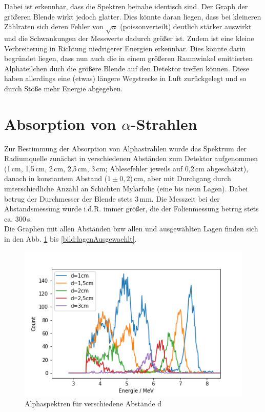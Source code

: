 Dabei ist erkennbar, dass die Spektren beinahe identisch sind. Der Graph der größeren Blende wirkt jedoch glatter. Dies könnte 
daran liegen, dass bei kleineren Zählraten sich deren Fehler von $\sqrt{n}$ (poissonverteilt) deutlich stärker auswirkt und die Schwankungen der 
Messwerte dadurch größer ist. Zudem ist eine kleine Verbreiterung in Richtung niedrigerer Energien erkennbar. Dies könnte darin begründet 
liegen, dass nun auch die in einem größeren Raumwinkel emittierten Alphateilchen duch die größere Blende auf den Detektor treffen können. 
Diese haben allerdings eine (etwas) längere Wegstrecke in Luft zurückgelegt und so durch Stöße mehr Energie abgegeben.





\section{Absorption von $\alpha$-Strahlen}
\label{subs:abs}

Zur Bestimmung der Absorption von Alphastrahlen wurde das Spektrum der Radiumquelle zunächst in verschiedenen Abständen zum Detektor 
aufgenommen (1\,cm, 1,5\,cm, 2\,cm, 2,5\,cm, 3\,cm; Ablesefehler jeweils auf 0,2\,cm abgeschätzt), danach in konstantem Abstand ($1 \pm 0,2$)\,cm, aber mit Durchgang durch 
unterschiedliche Anzahl an Schichten Mylarfolie (eine bis neun Lagen). 
Dabei betrug der Durchmesser der Blende stets 3\,mm. Die Messzeit bei der Abstandsmessung wurde i.d.R. immer größer, die der 
Folienmessung betrug stets ca. 300\,s.\\

Die Graphen mit allen Abständen bzw allen und ausgewählten Lagen finden sich in den Abb. \ref{bild:abstandAlle} bis \ref{bild:lagenAusgewaehlt}. \\

\begin{figure}[h]
    \centering
    \includegraphics[scale=0.75]{Bilder/abstandAlle.png}
    \caption{Alphaspektren für verschiedene Abstände d}
    \label{bild:abstandAlle}
\end{figure}

